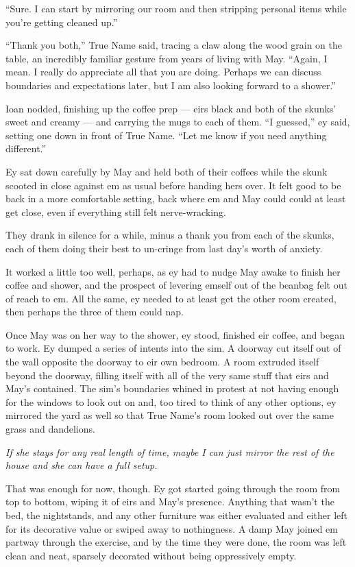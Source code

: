 ``Sure. I can start by mirroring our room and then stripping personal items while you're getting cleaned up.''

``Thank you both,'' True Name said, tracing a claw along the wood grain on the table, an incredibly familiar gesture from years of living with May. ``Again, I mean. I really do appreciate all that you are doing. Perhaps we can discuss boundaries and expectations later, but I am also looking forward to a shower.''

Ioan nodded, finishing up the coffee prep — eirs black and both of the skunks' sweet and creamy — and carrying the mugs to each of them. ``I guessed,'' ey said, setting one down in front of True Name. ``Let me know if you need anything different.''

Ey sat down carefully by May and held both of their coffees while the skunk scooted in close against em as usual before handing hers over. It felt good to be back in a more comfortable setting, back where em and May could could at least get close, even if everything still felt nerve-wracking.

They drank in silence for a while, minus a thank you from each of the skunks, each of them doing their best to un-cringe from last day's worth of anxiety.

It worked a little too well, perhaps, as ey had to nudge May awake to finish her coffee and shower, and the prospect of levering emself out of the beanbag felt out of reach to em. All the same, ey needed to at least get the other room created, then perhaps the three of them could nap.

Once May was on her way to the shower, ey stood, finished eir coffee, and began to work. Ey dumped a series of intents into the sim. A doorway cut itself out of the wall opposite the doorway to eir own bedroom. A room extruded itself beyond the doorway, filling itself with all of the very same stuff that eirs and May's contained. The sim's boundaries whined in protest at not having enough for the windows to look out on and, too tired to think of any other options, ey mirrored the yard as well so that True Name's room looked out over the same grass and dandelions.

\emph{If she stays for any real length of time, maybe I can just mirror the rest of the house and she can have a full setup.}

That was enough for now, though. Ey got started going through the room from top to bottom, wiping it of eirs and May's presence. Anything that wasn't the bed, the nightstands, and any other furniture was either evaluated and either left for its decorative value or swiped away to nothingness. A damp May joined em partway through the exercise, and by the time they were done, the room was left clean and neat, sparsely decorated without being oppressively empty.


